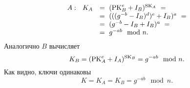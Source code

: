 \begin{enumerate}
        \[ \begin{array}{ll}
            A: ~~ K_A & = ~ (\textrm{PK}_B^e + I_B)^{\textrm{SK}_A} ~ = \\
                & = ~ (((g^{-b} - I_B)^d)^e + I_B)^a ~ = \\
                & = ~ (g^{-b} - I_B + I_B)^a ~ = \\
                & = ~ g^{-ab} \mod n. \\
        \end{array} \]
        Аналогично $B$ вычисляет
            \[ K_B = (\textrm{PK}_A^e + I_A)^{\textrm{SK}_B} = g^{-ab} \mod n. \]
        Как видно, ключи одинаковы
            \[ K = K_A = K_B = g^{-ab} \mod n. \]
\end{enumerate}
